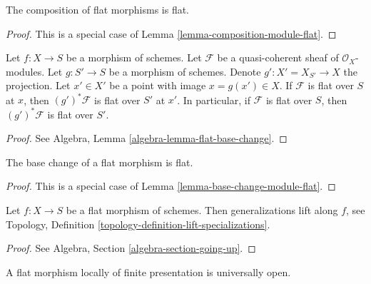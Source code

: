 \begin{lemma}
\label{lemma-composition-flat}
The composition of flat morphisms is flat.
\end{lemma}

\begin{proof}
This is a special case of Lemma \ref{lemma-composition-module-flat}.
\end{proof}

\begin{lemma}
\label{lemma-base-change-module-flat}
Let $f : X \to S$ be a morphism of schemes.
Let $\mathcal{F}$ be a quasi-coherent sheaf of $\mathcal{O}_X$-modules.
Let $g : S' \to S$ be a morphism of schemes.
Denote $g' : X' = X_{S'} \to X$ the projection.
Let $x' \in X'$ be a point with image $x = g(x') \in X$.
If $\mathcal{F}$ is flat over $S$ at $x$, then
$(g')^*\mathcal{F}$ is flat over $S'$ at $x'$.
In particular, if $\mathcal{F}$ is flat over $S$, then
$(g')^*\mathcal{F}$ is flat over $S'$.
\end{lemma}

\begin{proof}
See Algebra, Lemma \ref{algebra-lemma-flat-base-change}.
\end{proof}

\begin{lemma}
\label{lemma-base-change-flat}
The base change of a flat morphism is flat.
\end{lemma}

\begin{proof}
This is a special case of Lemma \ref{lemma-base-change-module-flat}.
\end{proof}

\begin{lemma}
\label{lemma-generalizations-lift-flat}
Let $f : X \to S$ be a flat morphism of schemes.
Then generalizations lift along $f$, see
Topology, Definition \ref{topology-definition-lift-specializations}.
\end{lemma}

\begin{proof}
See Algebra, Section \ref{algebra-section-going-up}.
\end{proof}

\begin{lemma}
\label{lemma-fppf-open}
A flat morphism locally of finite presentation is universally open.
\end{lemma}

